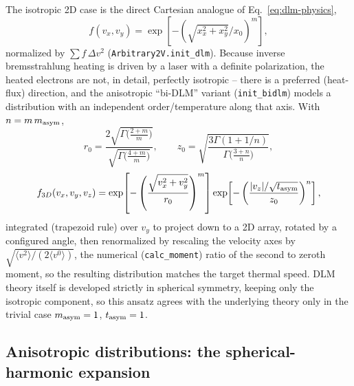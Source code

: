 \documentclass[11pt]{article}
\newcommand{\code}[1]{\texttt{#1}}
\begin{document}
The isotropic 2D case is the direct Cartesian analogue of Eq.~\ref{eq:dlm-physics},
\begin{equation}
  f(v_x,v_y) = \exp\!\left[-\left(\sqrt{x_x^2+x_y^2}/x_0\right)^m\right],
\end{equation}
normalized by $\sum f\,\Delta v^2$ (\code{Arbitrary2V.init\_dlm}). Because inverse
bremsstrahlung heating is driven by a laser with a definite polarization, the heated
electrons are not, in detail, perfectly isotropic -- there is a preferred (heat-flux)
direction, and the anisotropic ``bi-DLM'' variant (\code{init\_bidlm}) models a
distribution with an independent order/temperature along that axis. With $n=m\,m_{\rm asym}$,
\begin{equation}
  r_0 = \frac{2\sqrt{\Gamma\!\big(\tfrac{2+m}{m}\big)}}{\sqrt{\Gamma\!\big(\tfrac{4+m}{m}\big)}},
  \qquad z_0=\sqrt{\frac{3\Gamma(1+1/n)}{\Gamma\!\big(\tfrac{3+n}{n}\big)}},
\end{equation}
\begin{equation}
  f_{3D}(v_x,v_y,v_z) = \exp\!\left[-\left(\frac{\sqrt{v_x^2+v_y^2}}{r_0}\right)^m\right]
  \exp\!\left[-\left(\frac{\vert v_z\vert/\sqrt{t_{\rm asym}}}{z_0}\right)^n\right],
\end{equation}
integrated (trapezoid rule) over $v_y$ to project down to a 2D array, rotated by a
configured angle, then renormalized by rescaling the velocity axes by
$\sqrt{\langle v^2\rangle/(2\langle v^0\rangle)}$, the numerical (\code{calc\_moment}) ratio
of the second to zeroth moment, so the resulting distribution matches the target thermal
speed. DLM theory itself is developed strictly in
spherical symmetry, keeping only the isotropic component, so this ansatz agrees with the
underlying theory only in the trivial case $m_{\rm asym}=1$, $t_{\rm asym}=1$.

\subsection{Anisotropic distributions: the spherical-harmonic expansion}\label{sec:sph}
\end{document}
